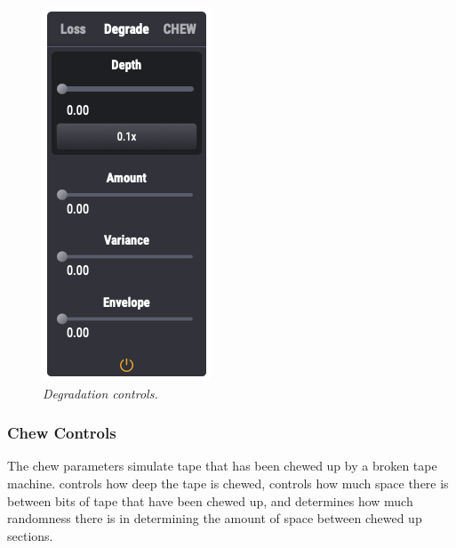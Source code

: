 \documentclass[landscape,twocolumn,a5paper]{manual}
\begin{document}
\begin{figure}[ht]
    \center
    \includegraphics[height=0.4\paperheight]{../Plugin/Screenshots/Degrade.png}
    \caption{\label{degrade_controls}{\it Degradation controls.}}
\end{figure}

\subsubsection{Chew Controls}
The chew parameters simulate tape that has been chewed up by
a broken tape machine.  controls how deep the
tape is chewed,  controls how much space
there is between bits of tape that have been chewed up, and
 determines how much randomness there is
in determining the amount of space between chewed up sections.
\end{document}
